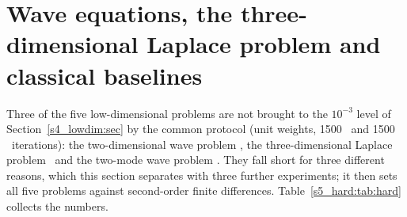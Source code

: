 \section{Wave equations, the three-dimensional Laplace problem and classical baselines}
\label{s5_hard:sec}

Three of the five low-dimensional problems are not brought to the $10^{-3}$ level of
Section~\ref{s4_lowdim:sec} by the common protocol (unit weights, 1500 \Adam\ and 1500
\LBFGS\ iterations): the two-dimensional wave problem \PWtwo, the three-dimensional Laplace
problem \PLthree\ and the two-mode wave problem \PWone. They fall short for three different
reasons, which this section separates with three further experiments; it then sets all five
problems against second-order finite differences. Table~\ref{s5_hard:tab:hard} collects the
numbers.

